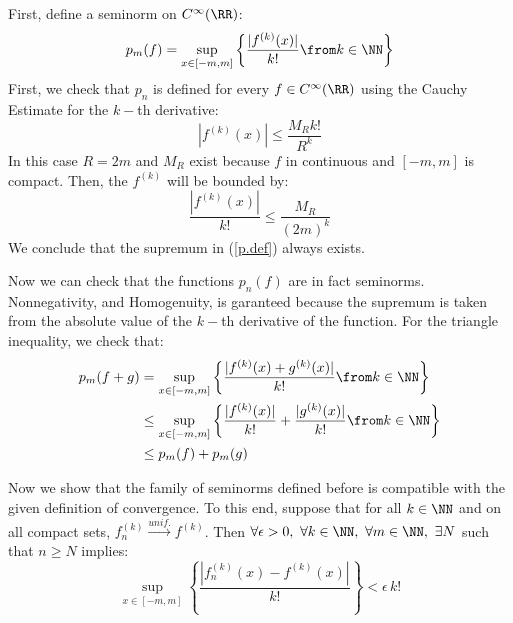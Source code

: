 First,  define a seminorm on $C^\infty(\RR)$:
\begin{equation}
p_m(f)= \sup_{x\in [-m,m]} \left\{ \frac{|f^{(k)}(x) |}{k!} \from k\in \NN \right\}\label{p.def}
\end{equation}
First, we check that $p_n$ is defined for every $f\in C^\infty(\RR)$ using the Cauchy Estimate for the $k-$th derivative:
$$ |f^{(k)}(x) | \leq \frac{M_R k!}{R^k}$$
In this case $R=2m$ and $M_R$ exist because $f$ in continuous and $[-m,m]$ is compact. 
Then, the  $f^{(k)} $ will be bounded by:
$$\frac{|f^{(k)}(x) |}{k!} \leq \frac{M_R}{(2m)^k}$$
We conclude that the supremum in (\ref{p.def}) always exists.

Now we can check that the functions $p_n(f)$ are in fact seminorms. 
Nonnegativity, and Homogenuity, is garanteed because the supremum is taken from the absolute value of the $k-$th derivative of the function.
For the triangle inequality, we check that:
\begin{align*}
p_m(f+g) & = \sup_{x\in [-m,m]} \left\{ \frac{|f^{(k)}(x) + g^{(k)}(x)  |}{k!} \from k\in \NN \right\}\\
&\leq \sup_{x\in [-m,m]} \left\{ \frac{|f^{(k)}(x) |}{k!} +\frac{|g^{(k)}(x) |}{k!}  \from k\in \NN \right\}\\
&\leq p_m(f) + p_m(g)
\end{align*}

Now we show that the family of seminorms defined before is compatible with the given definition of convergence. To this end, suppose that for all $k\in \NN$ and on all compact sets, $f^{(k)}_n \xrightarrow{unif.} f^{(k)}$. Then $\forall \epsilon >0, \ \forall k\in\NN,\ \forall m\in\NN,\ \exists N$ such that $n\geq N$ implies:
$$\sup_{x\in [-m,m]} \left\{ \frac{\left| f_n^{(k)}(x) - f^{(k)}(x)\right|}{k!}\right\} < \epsilon\, k!$$
